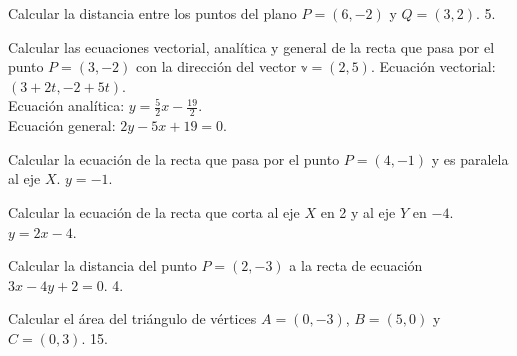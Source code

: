 
{Calcular la distancia entre los puntos del plano $P=(6,-2)$ y $Q=(3,2)$.
}
{5.
}
{
}


{Calcular las ecuaciones vectorial, analítica y general de la recta que pasa por el punto $P=(3,-2)$ con la dirección del vector $\mathbb{v}=(2,5)$.
}
{Ecuación vectorial: $(3+2t, -2+5t)$.\\
Ecuación analítica: $y=\frac{5}{2}x-\frac{19}{2}$.\\
Ecuación general: $2y-5x+19=0$.
}
{
}


{Calcular la ecuación de la recta que pasa por el punto $P=(4,-1)$ y es paralela al eje $X$.
}
{$y=-1$.
}
{
}


{Calcular la ecuación de la recta que corta al eje $X$ en 2 y al eje $Y$ en $-4$.
}
{$y=2x-4$.
}
{
}


{Calcular la distancia del punto $P=(2,-3)$ a la recta de ecuación $3x-4y+2=0$.
}
{4.
}
{
}


{Calcular el área del triángulo de vértices $A=(0,-3)$, $B=(5,0)$ y $C=(0,3)$.
}
{15.
}
{
}
